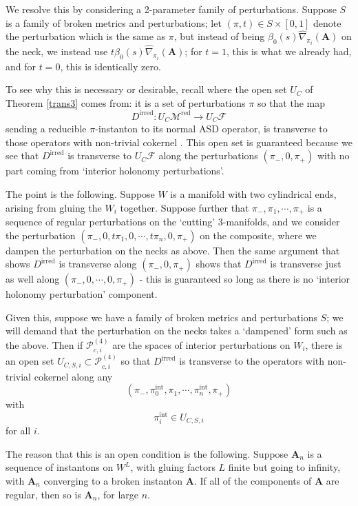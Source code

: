 \documentclass[10pt,a4paper]{amsart}
\theoremstyle{definition}
\theoremstyle{remark}
\numberwithin{figure}{qchap}
\begin{document}
We resolve this by considering a 2-parameter family of perturbations. Suppose $S$ is a family of broken metrics and perturbations; let $(\pi, t) \in S \times [0,1]$ denote the perturbation which is the same as $\pi$, but instead of being $\beta_0(s) \widehat{\nabla}_{\pi_i}(\mathbf{A})$ on the neck, we instead use $t\beta_0(s) \widehat{\nabla}_{\pi_i}(\mathbf{A})$; for $t = 1$, this is what we already had, and for $t = 0$, this is identically zero.

To see why this is necessary or desirable, recall where the open set $U_C$ of Theorem \ref{trans3} comes from: it is a set of perturbations $\pi$ so that the map
$$D^{\text{irred}}: U_C\mathcal M^{\text{red}} \to U_C \mathcal F$$
sending a reducible $\pi$-instanton to its normal ASD operator, is transverse to those operators with non-trivial cokernel . This open set is guaranteed because we see that $D^{\text{irred}}$ is transverse to $U_C \mathcal F$ along the perturbations $(\pi_-, 0, \pi_+)$ with no part coming from `interior holonomy perturbations'.

The point is the following. Suppose $W$ is a manifold with two cylindrical ends, arising from gluing the $W_i$ together. Suppose further that $\pi_-, \pi_1, \cdots, \pi_+$ is a sequence of regular perturbations on the `cutting' 3-manifolds, and we consider the perturbation $(\pi_-, 0, t\pi_1, 0, \cdots, t\pi_n, 0, \pi_+)$ on the composite, where we dampen the perturbation on the necks as above. Then the same argument that shows $D^{\text{irred}}$ is transverse along $(\pi_-, 0, \pi_+)$ shows that $D^{\text{irred}}$ is transverse just as well along $(\pi_-, 0, \cdots, 0, \pi_+)$ - this is guaranteed so long as there is no `interior holonomy perturbation' component.

Given this, suppose we have a family of broken metrics and perturbations $S$; we will demand that the perturbation on the necks takes a `dampened' form such as the above. Then if $\mathcal P^{(4)}_{c,i}$ are the spaces of interior perturbations on $W_i$, there is an open set $U_{C,S,i} \subset \mathcal P^{(4)}_{c,i}$ so that $D^{\text{irred}}$ is transverse to the operators with non-trivial cokernel along any
$$(\pi_-, \pi_0^{\text{int}}, \pi_1, \cdots, \pi_n^{\text{int}}, \pi_+)$$ with
$$\pi_i^{\text{int}} \in U_{C,S,i}$$ for all $i$.

The reason that this is an open condition is the following. Suppose $\mathbf{A}_n$ is a sequence of instantons on $W^L$, with gluing factors $L$ finite but going to infinity, with $\mathbf{A}_n$ converging to a broken instanton $\mathbf{A}$. If all of the components of $\mathbf{A}$ are regular, then so is $\mathbf{A}_n$, for large $n$.
\end{document}
